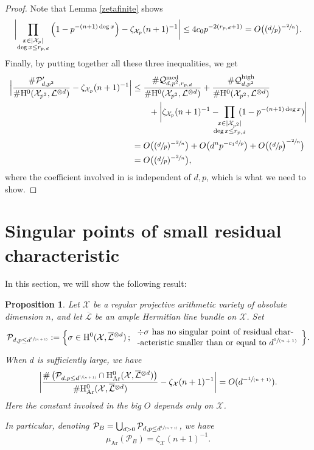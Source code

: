 \documentclass[JEP,XML,SOM,Unicode,published]{cedram}
\newcommand{\spfrac}[2]{\sfrac{#1}{(#2)}}
\newcommand{\sep}{\,;\,}
\theoremstyle{plain}
\newtheorem{prop}[thm]{Proposition}
\theoremstyle{definition}
\newcommand{\ho}{\mathrm{H}}
\newcommand{\X}{\mathcal{X}}
\newcommand{\Li}{\overline{\mathcal{L}}{}}
\newcommand{\li}{\mathcal{L}}
\begin{document}
\begin{proof}
Note that Lemma \ref{zetafinite} shows
\[
\biggl| \prod_{\substack{x\in |\X_{p}|\\ \deg x\leq r_{p,d}}} \left(1-p^{-(n+1)\deg x} \right) - \zeta_{\X_p}(n+1)^{-1} \biggr|\leq 4c_0 p^{-2(r_{p,d}+1)}=O\bigl((\sfrac{d}{p})^{-\sfrac{2}{n}}\bigl).
\]
Finally, by putting together all these three inequalities, we get
\begin{align*}
\Bigl| \frac{\#\mathcal{P}'_{d,p^2}}{\#\ho^0(\X_{p^2}, \li^{\otimes d})}-\zeta_{\X_p}(n+1)^{-1} \Bigr|&\leq \frac{\#\mathcal{Q}^{\mathrm{med}}_{d,p^2,r_{p,d}}}{\#\ho^0(\X_{p^2}, \li^{\otimes d})} +\frac{\#\mathcal{Q}^{\mathrm{high}}_{d,p^2}}{\#\ho^0(\X_{p^2}, \li^{\otimes d})}\\
&\hspace*{7mm}+ \biggl| \zeta_{\X_p}(n+1)^{-1}-\hspace*{-3mm}\prod_{\substack{x\in |\X_{p^2}|\\ \deg x\leq r_{p,d}}}\hspace*{-3mm}(1-p^{-(n+1)\deg x}) \biggr| \\
&= O\bigl((\sfrac{d}{p})^{-\sfrac{2}{n}} \bigr)+O\bigl(d^{n}p^{-c_1\sfrac{d}{p}}\bigr)+O\bigl((\sfrac{d}{p}\bigr)^{-\sfrac{2}{n}}\bigr)\\
&= O\bigl((\sfrac{d}{p})^{-\sfrac{2}{n}}\bigr),
\end{align*}
where the coefficient involved in is independent of $d,p$, which is what we need to show.
\end{proof}

\section{Singular points of small residual characteristic}\label{smallresidual}

In this section, we will show the following result:

\begin{prop}\label{small}
Let $\X$ be a regular projective arithmetic variety of absolute dimension $n$, and let $\Li$ be an ample Hermitian line bundle on $\X$. Set
\[
\mathcal{P}_{d, p\leq d^{\spfrac{1}{n+1}}}:=\Bigl\{ \sigma\in \ho^0(\X,\Li^{\otimes d})\sep \begin{array}{ll}
\div \sigma \text{ has no singular point of residual char-} \\
\text{-acteristic smaller than or equal to } d^{\spfrac{1}{n+1}}
\end{array}\Bigr\}.
\]
When $d$ is sufficiently large, we have
\[
\biggl| \frac{\#\left(\mathcal{P}_{d, p\leq d^{\spfrac{1}{n+1}}}\cap \ho^0_{\mathrm{Ar}}(\X, \overline{\mathcal{L}}{}^{\otimes d})\right)}{\#\ho^0_{\mathrm{Ar}}(\X, \overline{\mathcal{L}}{}^{\otimes d})} -\zeta_\X(n+1)^{-1} \biggr| = O(d^{-\spfrac{1}{n+1}}).
\]
Here the constant involved in the big $O$ depends only on $\X$.

In particular, denoting $\mathcal{P}_B=\bigcup_{d>0}\mathcal{P}_{d, p\leq d^{\spfrac{1}{n+1}}}$, we have
\[
\mu_{\mathrm{Ar}}(\mathcal{P}_B)=\zeta_\X(n+1)^{-1}.
\]
\end{prop}
\end{document}
